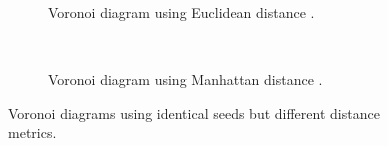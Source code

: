 \begin{figure}[H]
  \centering
  \begin{subfigure}[b]{0.4\textwidth}
    \caption{Voronoi diagram using Euclidean distance \cite{voronoi_euclidean}.}
    \label{fig:voronoi_euclidean}
  \end{subfigure}
  ~
  \begin{subfigure}[b]{0.4\textwidth}
    \caption{Voronoi diagram using Manhattan distance \cite{voronoi_manhattan}.}
    \label{fig:voronoi_manhattan}
  \end{subfigure}
  \caption{Voronoi diagrams using identical seeds but different distance metrics.}
  \label{fig:voronoi}
\end{figure}
